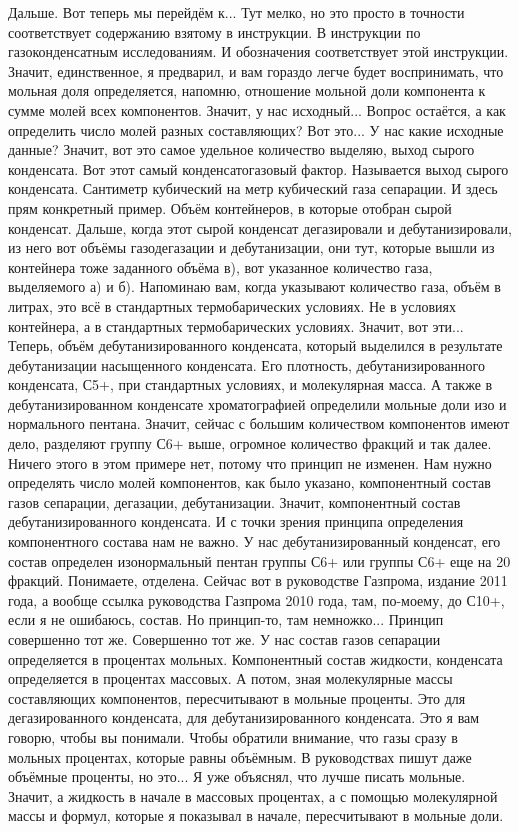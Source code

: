 \documentclass[main.tex]{subfiles}
\begin{document}
Дальше.
Вот теперь мы перейдём к...
Тут мелко, но это просто в точности соответствует содержанию взятому в инструкции.
В инструкции по газоконденсатным исследованиям.
И обозначения соответствует этой инструкции.
Значит, единственное, я предварил, и вам гораздо легче будет воспринимать, что мольная доля определяется, напомню, отношение мольной доли компонента к сумме молей всех компонентов.
Значит, у нас исходный...
Вопрос остаётся, а как определить число молей разных составляющих?
Вот это...
У нас какие исходные данные?
Значит, вот это самое удельное количество выделяю, выход сырого конденсата.
Вот этот самый конденсатогазовый фактор.
Называется выход сырого конденсата.
Сантиметр кубический на метр кубический газа сепарации.
И здесь прям конкретный пример.
Объём контейнеров, в которые отобран сырой конденсат.
Дальше, когда этот сырой конденсат дегазировали и дебутанизировали, из него вот объёмы газодегазации и дебутанизации, они тут, которые вышли из контейнера тоже заданного объёма в), вот указанное количество газа, выделяемого а) и б).
Напоминаю вам, когда указывают количество газа, объём в литрах, это всё в стандартных термобарических условиях.
Не в условиях контейнера, а в стандартных термобарических условиях.
Значит, вот эти...
Теперь, объём дебутанизированного конденсата, который выделился в результате дебутанизации насыщенного конденсата.
Его плотность, дебутанизированного конденсата, С5+, при стандартных условиях, и молекулярная масса.
А также в дебутанизированном конденсате хроматографией определили мольные доли изо и нормального пентана.
Значит, сейчас с большим количеством компонентов имеют дело, разделяют группу С6+ выше, огромное количество фракций и так далее.
Ничего этого в этом примере нет, потому что принцип не изменен.
Нам нужно определять число молей компонентов, как было указано, компонентный состав газов сепарации, дегазации, дебутанизации.
Значит, компонентный состав дебутанизированного конденсата.
И с точки зрения принципа определения компонентного состава нам не важно.
У нас дебутанизированный конденсат, его состав определен изонормальный пентан группы С6+ или группы С6+ еще на 20 фракций.
Понимаете, отделена.
Сейчас вот в руководстве Газпрома, издание 2011 года, а вообще ссылка руководства Газпрома 2010 года, там, по-моему, до С10+, если я не ошибаюсь, состав.
Но принцип-то, там немножко...
Принцип совершенно тот же.
Совершенно тот же.
У нас состав газов сепарации определяется в процентах мольных.
Компонентный состав жидкости, конденсата определяется в процентах массовых.
А потом, зная молекулярные массы составляющих компонентов, пересчитывают в мольные проценты.
Это для дегазированного конденсата, для дебутанизированного конденсата.
Это я вам говорю, чтобы вы понимали.
Чтобы обратили внимание, что газы сразу в мольных процентах, которые равны объёмным.
В руководствах пишут даже объёмные проценты, но это...
Я уже объяснял, что лучше писать мольные.
Значит, а жидкость в начале в массовых процентах, а с помощью молекулярной массы и формул, которые я показывал в начале, пересчитывают в мольные доли.
\end{document}
